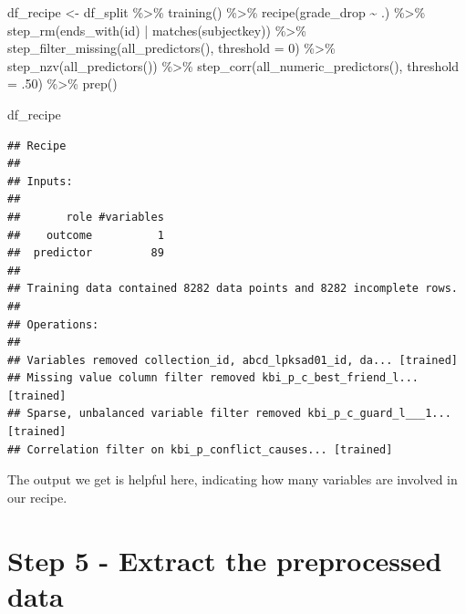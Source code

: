 \documentclass[
]{book}
\newenvironment{Shaded}{\begin{snugshade}}{\end{snugshade}}
\newcommand{\AttributeTok}[1]{\textcolor[rgb]{0.77,0.63,0.00}{#1}}
\newcommand{\DecValTok}[1]{\textcolor[rgb]{0.00,0.00,0.81}{#1}}
\newcommand{\FunctionTok}[1]{\textcolor[rgb]{0.00,0.00,0.00}{#1}}
\newcommand{\NormalTok}[1]{#1}
\newcommand{\OtherTok}[1]{\textcolor[rgb]{0.56,0.35,0.01}{#1}}
\newcommand{\SpecialCharTok}[1]{\textcolor[rgb]{0.00,0.00,0.00}{#1}}
\newcommand{\StringTok}[1]{\textcolor[rgb]{0.31,0.60,0.02}{#1}}
\begin{document}
\begin{Shaded}
\begin{Highlighting}[]
\NormalTok{df\_recipe }\OtherTok{\textless{}{-}}\NormalTok{ df\_split }\SpecialCharTok{\%\textgreater{}\%} 
  \FunctionTok{training}\NormalTok{() }\SpecialCharTok{\%\textgreater{}\%} 
  \FunctionTok{recipe}\NormalTok{(grade\_drop }\SpecialCharTok{\textasciitilde{}}\NormalTok{ .) }\SpecialCharTok{\%\textgreater{}\%} 
  \FunctionTok{step\_rm}\NormalTok{(}\FunctionTok{ends\_with}\NormalTok{(}\StringTok{\textquotesingle{}id\textquotesingle{}}\NormalTok{) }\SpecialCharTok{|} \FunctionTok{matches}\NormalTok{(}\StringTok{\textquotesingle{}subjectkey\textquotesingle{}}\NormalTok{)) }\SpecialCharTok{\%\textgreater{}\%} 
  \FunctionTok{step\_filter\_missing}\NormalTok{(}\FunctionTok{all\_predictors}\NormalTok{(), }\AttributeTok{threshold =} \DecValTok{0}\NormalTok{) }\SpecialCharTok{\%\textgreater{}\%}
  \FunctionTok{step\_nzv}\NormalTok{(}\FunctionTok{all\_predictors}\NormalTok{()) }\SpecialCharTok{\%\textgreater{}\%} 
  \FunctionTok{step\_corr}\NormalTok{(}\FunctionTok{all\_numeric\_predictors}\NormalTok{(), }\AttributeTok{threshold =}\NormalTok{ .}\DecValTok{50}\NormalTok{) }\SpecialCharTok{\%\textgreater{}\%}
  \FunctionTok{prep}\NormalTok{()}

\NormalTok{df\_recipe}
\end{Highlighting}
\end{Shaded}

\begin{verbatim}
## Recipe
## 
## Inputs:
## 
##       role #variables
##    outcome          1
##  predictor         89
## 
## Training data contained 8282 data points and 8282 incomplete rows. 
## 
## Operations:
## 
## Variables removed collection_id, abcd_lpksad01_id, da... [trained]
## Missing value column filter removed kbi_p_c_best_friend_l... [trained]
## Sparse, unbalanced variable filter removed kbi_p_c_guard_l___1... [trained]
## Correlation filter on kbi_p_conflict_causes... [trained]
\end{verbatim}

The output we get is helpful here, indicating how many variables are involved in our recipe.

\hypertarget{step-5---extract-the-preprocessed-data}{%
\section{Step 5 - Extract the preprocessed data}\label{step-5---extract-the-preprocessed-data}}
\end{document}
